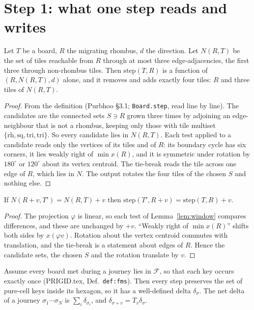 \documentclass[11pt]{article}
\theoremstyle{definition}\newtheorem{definition}[theorem]{Definition}\newtheorem{remark}[theorem]{Remark}
\begin{document}
\section{Step 1: what one step reads and writes}
\begin{lemma}[window]\label{lem:window}
Let $T$ be a board, $R$ the migrating rhombus, $d$ the direction. Let $N(R,T)$ be the set of tiles reachable from $R$ through at most three edge-adjacencies, the first
three through non-rhombus tiles. Then $\mathrm{step}(T,R)$ is a function of $(R,N(R,T),d)$ alone, and it removes and adds exactly four tiles: $R$ and three tiles of $N(R,T)$.
\end{lemma}
\begin{proof}
From the definition (Purbhoo \S3.1; \texttt{Board.step}, read line by line). The candidates are the connected sets $S\ni R$ grown three times by adjoining an edge-neighbour
that is not a rhombus, keeping only those with tile multiset $\{\mathrm{rh},\mathrm{sq},\mathrm{tri},\mathrm{tri}\}$. So every candidate lies in $N(R,T)$. Each test applied to a candidate
reads only the vertices of its tiles and of $R$: its boundary cycle has six corners, it lies weakly right of $\min x(R)$, and it is symmetric under rotation by $180^\circ$ or $120^\circ$ about its vertex centroid.
The tie-break reads the tile across one edge of $R$, which lies in $N$. The output rotates the four tiles of the chosen $S$ and nothing else.
\end{proof}
\begin{lemma}\label{lem:cov}
If $N(R+v,T')=N(R,T)+v$ then $\mathrm{step}(T',R+v)=\mathrm{step}(T,R)+v$.
\end{lemma}
\begin{proof}
The projection $\varphi$ is linear, so each test of Lemma~\ref{lem:window} compares differences, and these are unchanged by $+v$. ``Weakly right of $\min x(R)$'' shifts both sides by $x(\varphi v)$.
Rotation about the vertex centroid commutes with translation, and the tie-break is a statement about edges of $R$. Hence the candidate sets, the chosen $S$ and the rotation translate by $v$.
\end{proof}
\begin{lemma}\label{lem:add}
Assume every board met during a journey lies in $\mathcal F$, so that each key occurs exactly once (PRIGID.tex, Def.~\texttt{def:fms}). Then every step preserves the set of pure-cell keys
inside its hexagon, so it has a well-defined delta $\delta_\sigma$. The net delta of a journey $\sigma_1\cdots\sigma_N$ is $\sum_i\delta_{\sigma_i}$, and $\delta_{\sigma+v}=T_v\delta_\sigma$.
\end{lemma}
\end{document}
